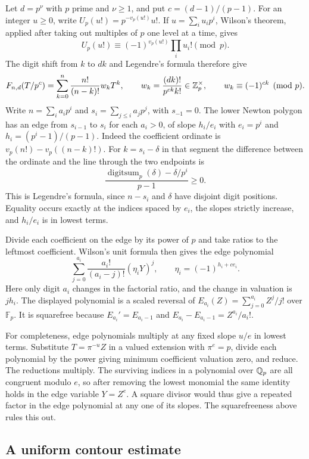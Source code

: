 Let \(d=p^\nu\) with \(p\) prime and \(\nu\ge1\),
and put \(c=(d-1)/(p-1)\). For an integer \(u\ge0\), write
\(U_p(u!)=p^{-v_p(u!)}u!\). If \(u=\sum_i u_i p^i\),
Wilson's theorem, applied after taking out multiples of \(p\)
one level at a time, gives
\[
 U_p(u!)\equiv(-1)^{v_p(u!)}\prod_i u_i!\pmod p.
\]
The digit shift from \(k\) to \(dk\) and Legendre's formula
therefore give
\[
 F_{n,d}(T/p^c)=\sum_{k=0}^n \frac{n!}{(n-k)!}w_k T^k,\qquad
 w_k=\frac{(dk)!}{p^{ck}k!}\in\mathbb Z_p^\times,\qquad
 w_k\equiv(-1)^{ck}\pmod p .
\]
Write \(n=\sum_i a_i p^i\) and \(s_i=\sum_{j\le i}a_jp^j\),
with \(s_{-1}=0\). The lower Newton polygon has an edge from
\(s_{i-1}\) to \(s_i\) for each \(a_i>0\), of slope \(h_i/e_i\)
with \(e_i=p^i\) and \(h_i=(p^i-1)/(p-1)\). Indeed the
coefficient ordinate is
\(v_p(n!)-v_p((n-k)!)\). For \(k=s_i-\delta\) in that segment
the difference between the ordinate and the line through
the two endpoints is
\[
 \frac{\operatorname{digitsum}_p(\delta)-\delta/p^i}{p-1}\ge0.
\]
This is Legendre's formula, since \(n-s_i\) and \(\delta\)
have disjoint digit positions. Equality occurs exactly at the
indices spaced by \(e_i\), the slopes strictly increase,
and \(h_i/e_i\) is in lowest terms.

Divide each coefficient on the edge by its power of \(p\)
and take ratios to the leftmost coefficient. Wilson's unit
formula then gives the edge polynomial
\[
 \sum_{j=0}^{a_i}\frac{a_i!}{(a_i-j)!}(\eta_i Y)^j,\qquad
 \eta_i=(-1)^{h_i+c e_i}.
\]
Here only digit \(a_i\) changes in the factorial ratio, and the
change in valuation is \(jh_i\). The displayed polynomial
is a scaled reversal of \(E_{a_i}(Z)=\sum_{j=0}^{a_i}Z^j/j!\)
over \(\mathbb F_p\). It is squarefree because
\(E_{a_i}'=E_{a_i-1}\) and \(E_{a_i}-E_{a_i-1}=Z^{a_i}/a_i!\).

For completeness, edge polynomials multiply at any fixed
slope \(u/e\) in lowest terms. Substitute \(T=\pi^{-u}Z\)
in a valued extension with \(\pi^e=p\), divide each polynomial
by the power giving minimum coefficient valuation zero,
and reduce. The reductions multiply. The surviving indices
in a polynomial over \(\mathbb Q_p\) are all congruent modulo \(e\),
so after removing the lowest monomial the same identity
holds in the edge variable \(Y=Z^e\).
A square divisor would thus give a repeated factor in the
edge polynomial at any one of its slopes. The squarefreeness
above rules this out.

\subsection{A uniform contour estimate}

